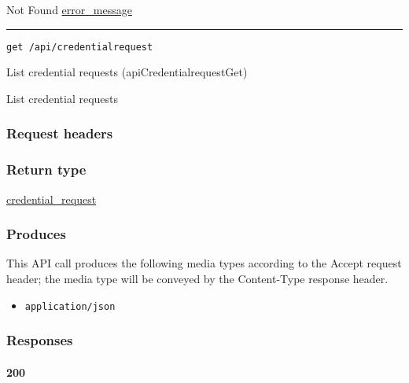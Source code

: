 Not Found \protect\hyperlink{error_message}{error\_message}

\begin{center}\rule{0.5\linewidth}{\linethickness}\end{center}

\protect\hypertarget{apiCredentialrequestGet}{}{}

\begin{verbatim}
get /api/credentialrequest
\end{verbatim}

List credential requests ({apiCredentialrequestGet})

List credential requests

\hypertarget{request-headers-68}{%
\subsubsection{Request headers}\label{request-headers-68}}

\hypertarget{return-type-91}{%
\subsubsection{Return type}\label{return-type-91}}

\protect\hyperlink{credential_request}{credential\_request}

\hypertarget{produces-117}{%
\subsubsection{Produces}\label{produces-117}}

This API call produces the following media types according to the
{Accept} request header; the media type will be conveyed by the
{Content-Type} response header.

\begin{itemize}
\tightlist
\item
  \texttt{application/json}
\end{itemize}

\hypertarget{responses-120}{%
\subsubsection{Responses}\label{responses-120}}

\hypertarget{section-392}{%
\paragraph{200}\label{section-392}}

